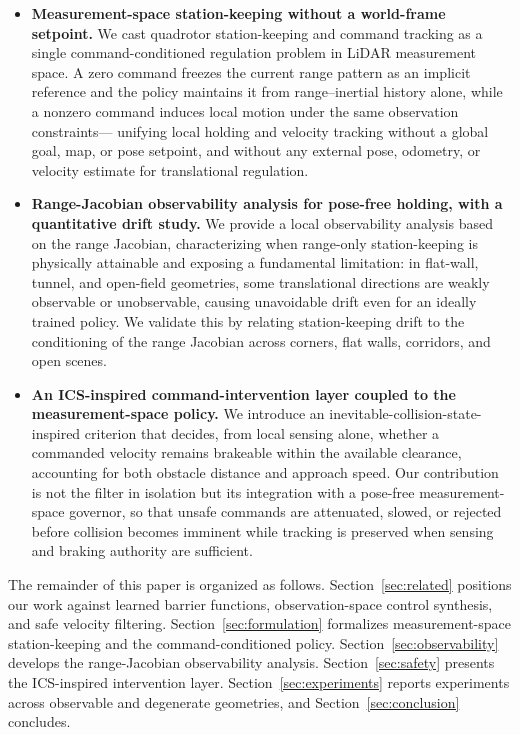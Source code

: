 \documentclass[11pt]{article}
\begin{document}
\begin{itemize}
  \item \textbf{Measurement-space station-keeping without a world-frame
  setpoint.} We cast quadrotor station-keeping and command tracking as a
  single command-conditioned regulation problem in LiDAR measurement space. A
  zero command freezes the current range pattern as an implicit reference and
  the policy maintains it from range--inertial history alone, while a nonzero
  command induces local motion under the same observation constraints---
  unifying local holding and velocity tracking without a global goal, map, or
  pose setpoint, and without any external pose, odometry, or velocity estimate
  for translational regulation.

  \item \textbf{Range-Jacobian observability analysis for pose-free holding,
  with a quantitative drift study.} We provide a local observability analysis
  based on the range Jacobian, characterizing when range-only station-keeping
  is physically attainable and exposing a fundamental limitation: in
  flat-wall, tunnel, and open-field geometries, some translational directions
  are weakly observable or unobservable, causing unavoidable drift even for an
  ideally trained policy. We validate this by relating station-keeping drift
  to the conditioning of the range Jacobian across corners, flat walls,
  corridors, and open scenes.

  \item \textbf{An ICS-inspired command-intervention layer coupled to the
  measurement-space policy.} We introduce an inevitable-collision-state-
  inspired criterion that decides, from local sensing alone, whether a
  commanded velocity remains brakeable within the available clearance,
  accounting for both obstacle distance and approach speed. Our contribution
  is not the filter in isolation but its integration with a pose-free
  measurement-space governor, so that unsafe commands are attenuated, slowed,
  or rejected before collision becomes imminent while tracking is preserved
  when sensing and braking authority are sufficient.
\end{itemize}

The remainder of this paper is organized as follows.
Section~\ref{sec:related} positions our work against learned barrier
functions, observation-space control synthesis, and safe velocity filtering.
Section~\ref{sec:formulation} formalizes measurement-space station-keeping and
the command-conditioned policy. Section~\ref{sec:observability} develops the
range-Jacobian observability analysis. Section~\ref{sec:safety} presents the
ICS-inspired intervention layer. Section~\ref{sec:experiments} reports
experiments across observable and degenerate geometries, and
Section~\ref{sec:conclusion} concludes.
\end{document}

